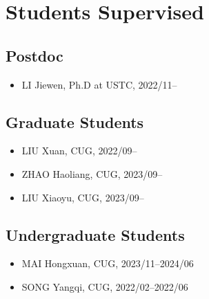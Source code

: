 \section{Students Supervised}

\subsection{Postdoc}
\begin{itemize}
\item LI Jiewen, Ph.D at USTC, 2022/11--
\end{itemize}

\subsection{Graduate Students}
\begin{itemize}
\item LIU Xuan, CUG, 2022/09--
\item ZHAO Haoliang, CUG, 2023/09--
\item LIU Xiaoyu, CUG, 2023/09--
\end{itemize}

\subsection{Undergraduate Students}
\begin{itemize}
\item MAI Hongxuan, CUG, 2023/11--2024/06
\item SONG Yangqi, CUG, 2022/02--2022/06
\end{itemize}
